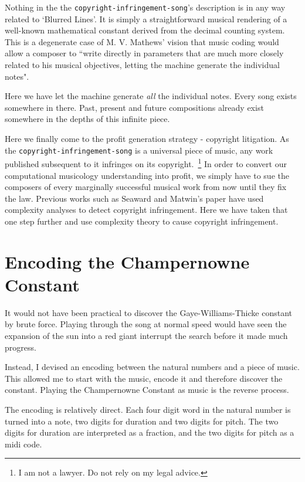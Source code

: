 \documentclass[numbers]{sigplanconf}
\begin{document}
Nothing in the the \verb|copyright-infringement-song|'s description is in any way related to `Blurred Lines'.
It is simply a straightforward musical rendering of a well-known mathematical constant derived from the decimal counting
system. This is a degenerate case of M. V. Mathews' vision that music coding would allow a composer to
``write directly in parameters that are much more
closely related to his musical objectives, letting the machine generate the individual
notes"\cite{The Digital Computer as a Musical Instrument}.

Here we have let the machine generate \textit{all} the individual notes. Every song exists somewhere in there. Past, present and
future compositions already exist somewhere in the depths of this infinite piece.

Here we finally come to the profit generation strategy - copyright litigation. As the \verb|copyright-infringement-song| is
a universal piece of music, any work published subsequent to it infringes on its copyright.~\footnote{I am not a lawyer. Do not rely on my legal advice.} In order to convert our computational musicology understanding into profit, we simply have to
sue the composers of every marginally successful musical work from now until they fix the law. Previous works such as Seaward
and Matwin's paper have used complexity analyses to detect copyright infringement\cite{Intrinsic Plaguerism Detection}.
Here we have taken that one step further and use complexity theory to cause copyright infringement.

\section{Encoding the Champernowne Constant}

It would not have been practical to discover the Gaye-Williams-Thicke constant by brute force. Playing through the song at normal
speed would have seen the expansion of the sun into a red giant interrupt the search before it made much progress.

Instead, I devised an encoding between the natural numbers and a piece of music. This allowed me to start with the music, encode
it and therefore discover the constant. Playing the Champernowne Constant as music is the reverse process.

The encoding is relatively direct. Each four digit word in the natural number is turned into a note, two digits for duration and
two digits for pitch. The two digits for duration are interpreted as a fraction, and the two digits for pitch as a midi code.
\end{document}
